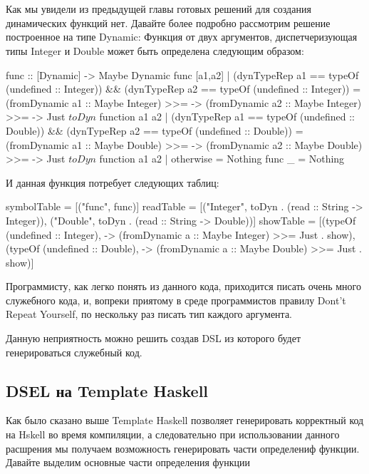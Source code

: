\chapter{}

Как мы увидели из предыдущей главы готовых решений для создания
динамических функций нет. Давайте более подробно рассмотрим решение
построенное на типе Dynamic: Функция от двух аргументов,
диспетчеризующая типы Integer и Double может быть определена следующим
образом:

\begin{code}
func :: [Dynamic] -> Maybe Dynamic
func [a1,a2] | (dynTypeRep a1 == typeOf (undefined :: Integer))
               && (dynTypeRep a2 == typeOf (undefined :: Integer))
	     = (fromDynamic a1 :: Maybe Integer) >>=  ->
	       (fromDynamic a2 :: Maybe Integer) >>=  ->
	       Just $ toDyn $ function a1 a2
             | (dynTypeRep a1 == typeOf (undefined :: Double))
               && (dynTypeRep a2 == typeOf (undefined :: Double))
	     = (fromDynamic a1 :: Maybe Double) >>=  ->
	       (fromDynamic a2 :: Maybe Double) >>=  ->
	       Just $ toDyn $ function a1 a2
	     | otherwise = Nothing
func _ = Nothing
\end{code}	       

И данная функция потребует следующих таблиц:

\begin{code}
symbolTable = [("func", func)]
readTable = [("Integer", toDyn . (read :: String -> Integer)),
             ("Double", toDyn . (read :: String -> Double))]
showTable = [(typeOf (undefined :: Integer),
              \a -> (fromDynamic a :: Maybe Integer) >>= Just . show),
	     (typeOf (undefined :: Double),
              \a -> (fromDynamic a :: Maybe Double) >>= Just . show)]
\end{code}

Программисту, как легко понять из данного кода, приходится писать
очень много служебного кода, и, вопреки приятому в среде программистов
правилу Dont't Repeat Yourself, по нескольку раз писать тип каждого
аргумента.

Данную неприятность можно решить создав DSL из которого будет
генерироваться служебный код.

\section{DSEL на Template Haskell}
Как было сказано выше Template Haskell позволяет генерировать
корректный код на Hskell во время компиляции, а следовательно при
использовании данного расшрения мы получаем возможность генерировать
части определениф функции. Давайте выделим основные части определения
функции

